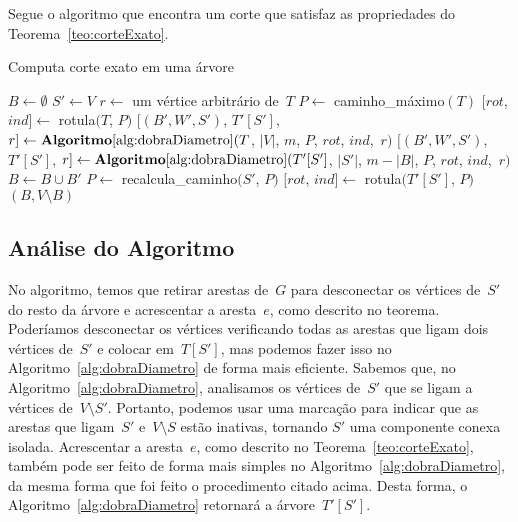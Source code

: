 		Segue o algoritmo que encontra um corte que satisfaz as 
		propriedades do Teorema~\ref{teo:corteExato}.
		
		\bigskip

		\begin{algorithm}[H]
		\label{alg:corteExato}

			\caption{Computa corte exato em uma árvore}
			$B\gets \emptyset$\;
			$S'\gets V$\;
			$r\gets$ um vértice arbitrário de~$T$\;
			$P\gets$ {\sc caminho\_máximo}$(T)$\;
			$[rot$, $ind]\gets$ {\sc rotula}$(T$, $P)$\;
			$[(B',W',S')$, $T'[S']$, $r]\gets
				\mathbf {Algoritmo\ref{alg:dobraDiametro}}(T$,
				$|V|$, $m$, $P$, $rot$, $ind$,~$r)$\;
			{
				$[(B',W',S')$, $T'[S']$, $r]\gets
					\mathbf {Algoritmo\ref{alg:dobraDiametro}}(T'[S']$,
					$|S'|$, $m-|B|$, $P$, $rot$, $ind$,~$r)$\;
				$B\gets B\cup B'$\;
				$P\gets$ {\sc recalcula\_caminho}$(S'$, $P)$\;
				$[rot$, $ind]\gets$ {\sc rotula}$(T'[S']$, $P)$
			}
			\Return $(B,V\setminus B)$\;

		\end{algorithm}	

		\bigskip

		\subsection*{Análise do Algoritmo}


		No algoritmo, temos que 
		retirar arestas de~$G$ para 
		desconectar os vértices de~$S'$ do resto da árvore
		e acrescentar a aresta~$e$, como descrito no teorema.
		Poderíamos desconectar os vértices verificando todas as arestas que 
		ligam dois vértices de~$S'$ e colocar em~$T[S']$, mas podemos
		fazer isso no Algoritmo~\ref{alg:dobraDiametro} de forma 
		mais eficiente. 
		Sabemos que, no Algoritmo~\ref{alg:dobraDiametro},
		analisamos os vértices de~$S'$ que se ligam a vértices 
		de~$V\setminus S'$. 
		Portanto, podemos usar uma marcação para indicar que as 
		arestas que ligam~$S'$ e~${V\setminus S}$ estão inativas, 
		tornando $S'$ uma componente conexa isolada. 
		Acrescentar a aresta~$e$, como descrito no
		Teorema~\ref{teo:corteExato}, também pode ser feito de 
		forma mais simples no Algoritmo~\ref{alg:dobraDiametro},
		da mesma forma que foi feito o procedimento citado acima.
		Desta forma, o Algoritmo~\ref{alg:dobraDiametro} retornará
		a árvore~$T'[S']$.

